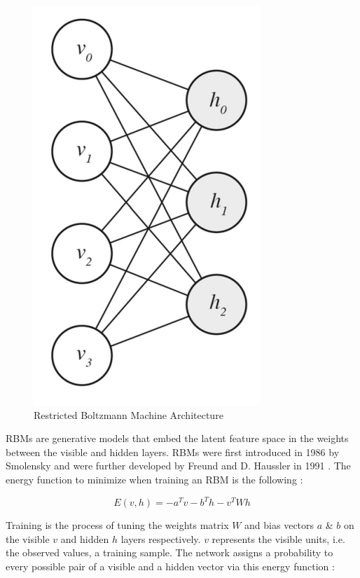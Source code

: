 \documentclass[%
 reprint,
 amsmath,amssymb,
 aps,
]{revtex4-2}
\begin{document}
\begin{figure}[h]
    \includegraphics[width=0.6\columnwidth]{rbmgraph.png}
    \caption{\label{fig:backprop}Restricted Boltzmann Machine Architecture \cite{Jain2020}}
\end{figure}



RBMs are generative models that embed the latent feature space in the weights between the visible and hidden layers. RBMs were first introduced in 1986 by Smolensky and were further developed by Freund and D. Haussler in 1991 \cite{Smolensky1986InformationPI} \cite{NIPS1991_33e8075e}. The energy function to minimize when training an RBM is the following \cite{hopfield}:

\begin{equation}
E(v, h) = -a^Tv -b^Th -v^TWh
\label{eq:rbmEnergy}
\end{equation}



Training is the process of tuning the weights matrix $W$ and bias vectors $a$ \& $b$ on the visible $v$ and hidden $h$ layers respectively. $v$ represents the visible units, i.e. the observed values, a training sample. The network assigns a probability to every possible pair of a visible and a hidden vector via this energy function \cite{Hinton2012}:
\end{document}
